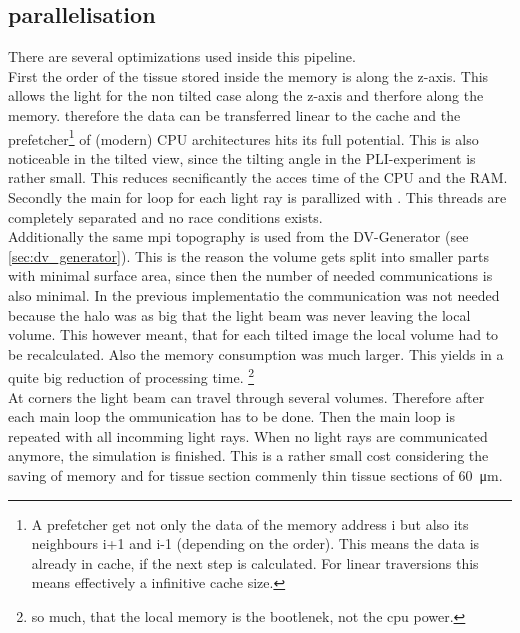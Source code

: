 \subsection{parallelisation}
There are several optimizations used inside this pipeline.\\
% 
First the order of the tissue stored inside the memory is along the z-axis.
This allows the light for the non tilted case along the z-axis and therfore along the memory.
therefore the data can be transferred linear to the cache and the prefetcher\footnote{A prefetcher get not only the data of the memory address i but also its neighbours i+1 and i-1 (depending on the order). This means the data is already in cache, if the next step is calculated. For linear traversions this means effectively a infinitive cache size.} of (modern) \ac{CPU} architectures hits its full potential.
This is also noticeable in the tilted view, since the tilting angle in the \ac{PLI}-experiment is rather small.
This reduces secnificantly the acces time of the \ac{CPU} and the \ac{RAM}.\\
% 
Secondly the main for loop for each light ray is parallized with \openmp.
This threads are completely separated and no race conditions exists.\\
% 
Additionally the same mpi topography is used from the DV-Generator (see \cref{sec:dv_generator}).
This is the reason the volume gets split into smaller parts with minimal surface area, since then the number of needed communications is also minimal.
In the previous \simpli implementatio the communication was not needed because the halo was as big that the light beam was never leaving the local volume.
This however meant, that for each tilted image the local volume had to be recalculated.
Also the memory consumption was much larger.
This yields in a quite big reduction of processing time. \footnote{so much, that the local memory is the bootlenek, not the cpu power.}\\
% 
At corners the light beam can travel through several \mpi volumes. Therefore after each main loop the ommunication has to be done.
Then the main loop is repeated with all incomming light rays.
When no light rays are communicated anymore, the simulation is finished.
This is a rather small cost considering the saving of memory and for tissue section commenly thin tissue sections of \SI{60}{\micro\meter}.
% 
% 
% 
% 
